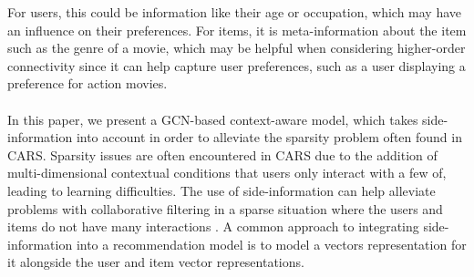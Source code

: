 For users, this could be information like their age or occupation, which may have an influence on their preferences.
For items, it is meta-information about the item such as the genre of a movie, which may be helpful when considering higher-order connectivity since it can help capture user preferences, such as a user displaying a preference for action movies.
\\\\
In this paper, we present a GCN-based context-aware model, which takes side-information into account in order to alleviate the sparsity problem often found in CARS.
Sparsity issues are often encountered in CARS due to the addition of multi-dimensional contextual conditions that users only interact with a few of\cite{SparsityCARS}, leading to learning difficulties.
The use of side-information can help alleviate problems with collaborative filtering in a sparse situation where the users and items do not have many interactions \cite{KGAT}. 
A common approach to integrating side-information into a recommendation model is to model a vectors representation for it alongside the user and item vector representations.

